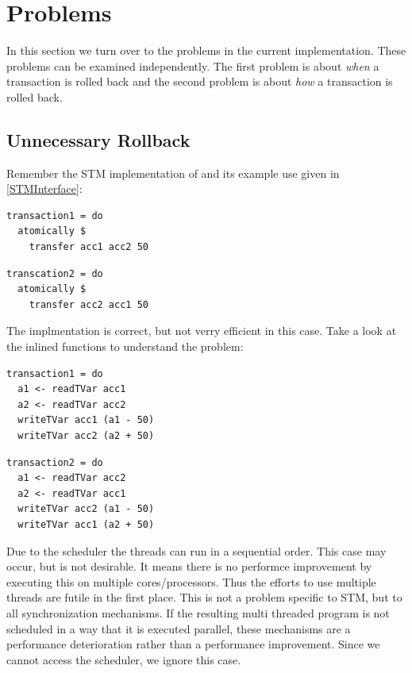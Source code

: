\section{Problems}
In this section we turn over to the problems in the current implementation. These problems can be examined independently. The first problem is about
\textit{when} a transaction is rolled back and the second problem is about \textit{how} a transaction is rolled back.

\subsection{Unnecessary Rollback}
\label{Prob:UnRo}
Remember the STM implementation of  and its example use given in \ref{STMInterface}: 
\par\noindent
\begin{minipage}[t]{.45\textwidth}
\begin{lstlisting}[frame=lrtb]
transaction1 = do
  atomically $
    transfer acc1 acc2 50
\end{lstlisting}
\end{minipage}
\hfill
\begin{minipage}[t]{.45\textwidth}
\begin{lstlisting}[frame=lrtb]
transcation2 = do 
  atomically $ 
    transfer acc2 acc1 50
\end{lstlisting}
\end{minipage}
The implmentation is correct, but not verry efficient in this case. Take a look at the inlined functions to understand the 
problem:
\par\noindent
\begin{minipage}[t]{.45\textwidth}
\begin{lstlisting}[frame=lrtb]
transaction1 = do
  a1 <- readTVar acc1
  a2 <- readTVar acc2
  writeTVar acc1 (a1 - 50)
  writeTVar acc2 (a2 + 50)
\end{lstlisting}
\end{minipage}
\hfill
\begin{minipage}[t]{.45\textwidth}
\begin{lstlisting}[frame=lrtb]
transaction2 = do 
  a1 <- readTVar acc2
  a2 <- readTVar acc1
  writeTVar acc2 (a1 - 50)
  writeTVar acc1 (a2 + 50)
\end{lstlisting}
\end{minipage}

Due to the scheduler the threads can run in a sequential order. This case may occur, but is not desirable. It means 
there is no performce improvement by executing this on multiple cores/processors. Thus the efforts to use multiple
threads are futile in the first place. This is not a problem specific to STM, but to all synchronization mechanisms. 
If the resulting multi threaded program is not scheduled in a way that it is executed parallel, these mechanisms are a
performance deterioration rather than a performance improvement. Since we cannot access the scheduler, we ignore 
this case. 

